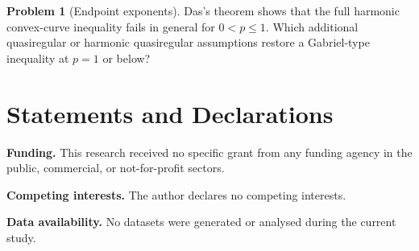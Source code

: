 \documentclass[11pt]{article}
\theoremstyle{definition}
\newtheorem{problem}[theorem]{Problem}
\theoremstyle{remark}
\begin{document}
\begin{problem}[Endpoint exponents]
Das's theorem shows that the full harmonic convex-curve inequality fails in general for $0<p\le1$. Which additional quasiregular or harmonic quasiregular assumptions restore a Gabriel-type inequality at $p=1$ or below?
\end{problem}

\section*{Statements and Declarations}

\noindent\textbf{Funding.}
This research received no specific grant from any funding agency in the public, commercial, or not-for-profit sectors.

\medskip
\noindent\textbf{Competing interests.}
The author declares no competing interests.

\medskip
\noindent\textbf{Data availability.}
No datasets were generated or analysed during the current study.
\end{document}
